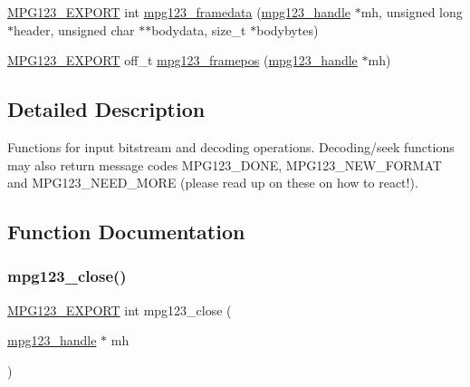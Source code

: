 \begin{DoxyCompactItemize}
\item 
\mbox{\hyperlink{mpg123_8h_a2ba98cfba3f760879df70e755b2a61cc}{M\+P\+G123\+\_\+\+E\+X\+P\+O\+RT}} int \mbox{\hyperlink{group__mpg123__input_gaa4c4e18d7defd6e5fb7addc3caf8d946}{mpg123\+\_\+framedata}} (\mbox{\hyperlink{group__mpg123__init_ga6728e2839a395f3a07d4514da659faca}{mpg123\+\_\+handle}} $\ast$mh, unsigned long $\ast$header, unsigned char $\ast$$\ast$bodydata, size\+\_\+t $\ast$bodybytes)
\item 
\mbox{\hyperlink{mpg123_8h_a2ba98cfba3f760879df70e755b2a61cc}{M\+P\+G123\+\_\+\+E\+X\+P\+O\+RT}} off\+\_\+t \mbox{\hyperlink{group__mpg123__input_gaf8d143984f9fd2ea91e9b10a6110c129}{mpg123\+\_\+framepos}} (\mbox{\hyperlink{group__mpg123__init_ga6728e2839a395f3a07d4514da659faca}{mpg123\+\_\+handle}} $\ast$mh)
\end{DoxyCompactItemize}


\subsection{Detailed Description}
Functions for input bitstream and decoding operations. Decoding/seek functions may also return message codes M\+P\+G123\+\_\+\+D\+O\+NE, M\+P\+G123\+\_\+\+N\+E\+W\+\_\+\+F\+O\+R\+M\+AT and M\+P\+G123\+\_\+\+N\+E\+E\+D\+\_\+\+M\+O\+RE (please read up on these on how to react!). 

\subsection{Function Documentation}
\mbox{\label{group__mpg123__input_ga156eb0774196db868485662dc31621af}} 
\subsubsection{\texorpdfstring{mpg123\_close()}{mpg123\_close()}}
{\footnotesize\ttfamily \mbox{\hyperlink{mpg123_8h_a2ba98cfba3f760879df70e755b2a61cc}{M\+P\+G123\+\_\+\+E\+X\+P\+O\+RT}} int mpg123\+\_\+close (\begin{DoxyParamCaption}\item[{\mbox{\hyperlink{group__mpg123__init_ga6728e2839a395f3a07d4514da659faca}{mpg123\+\_\+handle}} $\ast$}]{mh }\end{DoxyParamCaption})}

